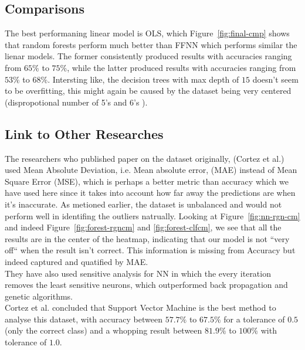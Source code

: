 \documentclass[english,notitlepage,reprint,nofootinbib]{revtex4-1}
\begin{document}
\subsection{Comparisons}
The best performaning linear model is OLS, which 
Figure~\ref{fig:final-cmp} shows that random forests perform much better than FFNN which performs similar the lienar models. The former consistently produced results with accuracies ranging from $ 65\% $ to $ 75\% $, while the latter produced results with accuracies ranging from $ 53\% $ to $ 68\% $. Intersting like, the decision trees with max depth of $ 15 $ doesn't seem to be overfitting, this might again be caused by the dataset being very centered (dispropotional number of 5's and 6's ).

\subsection{Link to Other Researches}
The researchers who published paper on the dataset originally, (Cortez et al.) used Mean Absolute Deviation, i.e. Mean absolute error, (MAE) instead of Mean Square Error (MSE), which is perhaps a better metric than accuracy which we have used here since it takes into account how far away the predictions are when it's inaccurate. As metioned earlier, the dataset is unbalanced and would not perform well in identifing the outliers natrually. Looking at Figure~\ref{fig:nn-rgn-cm} and indeed Figure~\ref{fig:forest-rgncm} and \ref{fig:forest-clfcm}, we see that all the results are in the center of the heatmap, indicating that our model is not ``very off`` when the result isn't correct. This information is missing from Accuracy but indeed captured and quatified by MAE. \\

They have also used sensitive analysis for NN in which the every iteration removes the least sensitive neurons, which outperformed back propagation and genetic algorithms. \\

Cortez et al. concluded that Support Vector Machine is the best method to analyse this dataset, with accuracy between $57.7\%$ to $67.5\%$ for a tolerance of $ 0.5 $ (only the correct class) and a whopping result between $ 81.9\% $ to $100\%$ with tolerance of $ 1.0 $. \cite{CORTEZ2009547}
\end{document}

